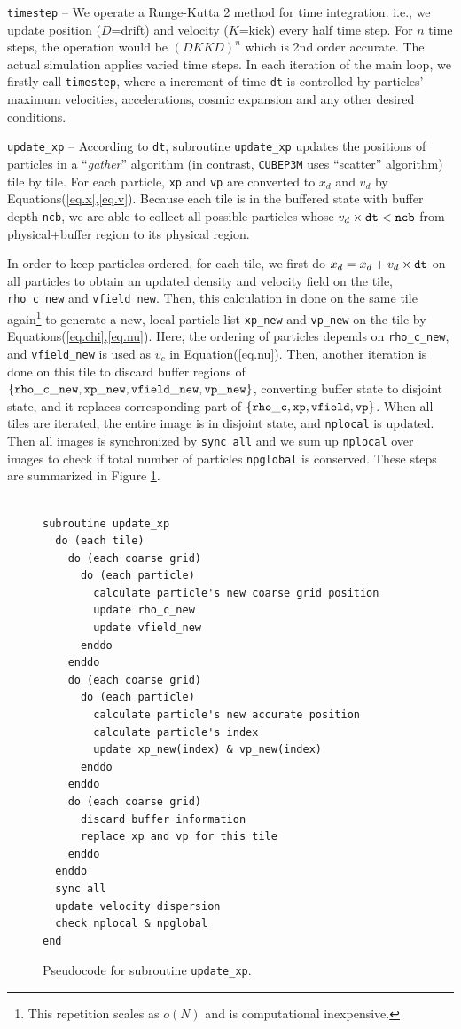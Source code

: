 \documentclass[10pt,twocolumn,preprint]{emulateapj}
\begin{document}
{\tt timestep} --
We operate a Runge-Kutta 2 method for time integration. i.e., we update position ($D$=drift) and velocity ($K$=kick) every half time step. For $n$ time steps, the operation would be $(DKKD)^n$ which is 2nd order accurate. The actual simulation applies varied time steps. In each iteration of the main loop, we firstly call {\tt timestep}, where a increment of time {\tt dt} is controlled by particles' maximum velocities, accelerations, cosmic expansion and any other desired conditions.

{\tt update\_xp} --
According to {\tt dt}, subroutine {\tt update\_xp} updates the positions of particles in a ``{\it gather}'' algorithm (in contrast, {\tt CUBEP3M} uses ``scatter'' algorithm) tile by tile. For each particle, {\tt xp} and {\tt vp} are converted to $x_d$ and $v_d$ by Equations(\ref{eq.x},\ref{eq.v}). Because each tile is in the buffered state with buffer depth {\tt ncb}, we are able to collect all possible particles whose $v_d\times{\tt dt}<{\tt ncb}$ from physical+buffer region to its physical region.

In order to keep particles ordered, for each tile, we first do $x_d=x_d+v_d\times{\tt dt}$ on all particles to obtain an updated density and velocity field on the tile, {\tt rho\_c\_new} and {\tt vfield\_new}. Then, this calculation in done on the same tile again\footnote{This repetition scales as $o(N)$ and is computational inexpensive.} to generate a new, local particle list {\tt xp\_new} and {\tt vp\_new} on the tile by Equations(\ref{eq.chi},\ref{eq.nu}). Here, the ordering of particles depends on {\tt rho\_c\_new}, and {\tt vfield\_new} is used as $v_c$ in Equation(\ref{eq.nu}). Then, another iteration is done on this tile to discard buffer regions of $\{{\tt rho\_c\_new},{\tt xp\_new},{\tt vfield\_new},{\tt vp\_new}\}$, converting buffer state to disjoint state, and it replaces corresponding part of $\{{\tt rho\_c},{\tt xp},{\tt vfield},{\tt vp}\}$. When all tiles are iterated, the entire image is in disjoint state, and {\tt nplocal} is updated. Then all images is synchronized by {\tt sync all} and we sum up {\tt nplocal} over images to check if total number of particles {\tt npglobal} is conserved. These steps are summarized in Figure \ref{fig.update_xp}.

\begin{figure}[t]
\begin{verbatim}

subroutine update_xp
  do (each tile)
    do (each coarse grid)
      do (each particle)
        calculate particle's new coarse grid position
        update rho_c_new
        update vfield_new
      enddo
    enddo
    do (each coarse grid)
      do (each particle)
        calculate particle's new accurate position
        calculate particle's index
        update xp_new(index) & vp_new(index)
      enddo
    enddo
    do (each coarse grid)
      discard buffer information
      replace xp and vp for this tile
    enddo
  enddo
  sync all
  update velocity dispersion
  check nplocal & npglobal
end
\end{verbatim}
\caption{Pseudocode for subroutine {\tt update\_xp}.}
\label{fig.update_xp}
\end{figure}
\end{document}
